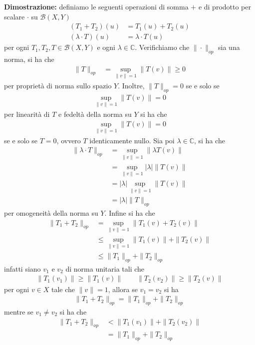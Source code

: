 \documentclass{article}
\numberwithin{equation}{subsection}
\begin{document}
\textbf{Dimostrazione:} definiamo le seguenti operazioni di somma $+$ e di prodotto per scalare $\cdot$ su $\mathcal{B}(X, Y)$
\begin{align*}
    (T_1 + T_2)(u) &= T_1(u) + T_2(u)  \\
    (\lambda \cdot T)(u) &= \lambda \cdot T(u) 
\end{align*}
per ogni $T_1, T_2, T \in \mathcal{B}(X, Y)$ e ogni $\lambda \in \mathbb{C}$. Verifichiamo che $\|\cdot\|_{op}$ sia una norma, si ha che
\begin{align*}
    \|T\|_{op} &= \sup_{\|v\| = 1}\|T(v)\| \geq 0 
\end{align*}
per proprietà di norma sullo spazio $Y$. Inoltre, $\|T\|_{op} = 0$ se e solo se
\begin{align*}
    \sup_{\|v\| = 1}\|T(v)\| = 0 
\end{align*}
per linearità di $T$ e fedeltà della norma su $Y$ si ha che
\begin{align*}
    \sup_{\|v\| = 1}\|T(v)\| = 0 
\end{align*}
se e solo se $T = 0$, ovvero $T$ identicamente nullo. Sia poi $\lambda \in \mathbb{C}$, si ha che
\begin{align*}
    \|\lambda\cdot T\|_{op} &= \sup_{\|v\| = 1}\|\lambda T(v)\|  \\
    &= \sup_{\|v\| = 1}|\lambda|\|T(v)\|  \\
    &= |\lambda|\sup_{\|v\| = 1}\|T(v)\|  \\
    &= |\lambda|\|T\|_{op} 
\end{align*}
per omogeneità della norma su $Y$. Infine si ha che
\begin{align*}
    \|T_1 + T_2\|_{op} &= \sup_{\|v\| = 1}\|T_1(v) + T_2(v)\|  \\
    &\leq \sup_{\|v\| = 1}\|T_1(v)\| + \|T_2(v)\|  \\
    &\leq \|T_1\|_{op} + \|T_2\|_{op} 
\end{align*}
infatti siano $v_1$ e $v_2$ di norma unitaria tali che
\begin{align*}
    \|T_1(v_1)\| \geq \|T_1(v)\| \qquad \|T_2(v_2)\| \geq \|T_2(v)\| 
\end{align*}
per ogni $v \in X$ tale che $\|v\| = 1$, allora se $v_1 = v_2$ si ha
\begin{align*}
    \|T_1 + T_2\|_{op} = \|T_1\|_{op} + \|T_2\|_{op} 
\end{align*}
mentre se $v_1 \neq v_2$ si ha che
\begin{align*}
    \|T_1 + T_2\|_{op} &< \|T_1(v_1)\| + \|T_2(v_2)\|  \\
    &= \|T_1\|_{op} + \|T_2\|_{op} 
\end{align*}
\end{document}
